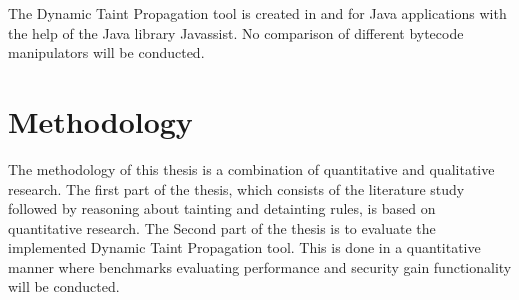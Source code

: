 The Dynamic Taint Propagation tool is created in and for Java applications with the help of the Java library Javassist. No comparison of different bytecode manipulators will be conducted.

\section{Methodology}
The methodology of this thesis is a combination of quantitative and qualitative research. The first part of the thesis, which consists of the literature study followed by reasoning about tainting and detainting rules, is based on quantitative research. The Second part of the thesis is to evaluate the implemented Dynamic Taint Propagation tool. This is done in a quantitative manner where benchmarks evaluating performance and security gain functionality will be conducted.

